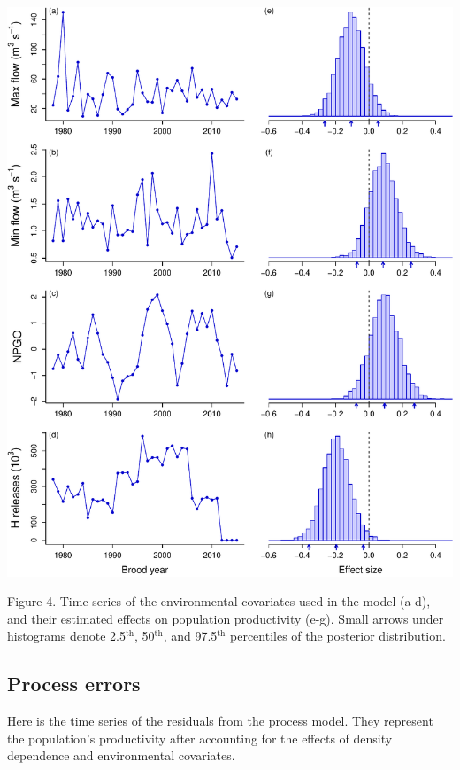 \documentclass[11pt,]{article}
\begin{document}
\begin{center}\includegraphics{App_3_Summarize_results_files/figure-latex/fig_4_cov_effects-1} \end{center}

Figure 4. Time series of the environmental covariates used in the model
(a-d), and their estimated effects on population productivity (e-g).
Small arrows under histograms denote 2.5\(^\text{th}\),
50\(^\text{th}\), and 97.5\(^\text{th}\) percentiles of the posterior
distribution.

\hypertarget{process-errors}{%
\subsection{Process errors}\label{process-errors}}

Here is the time series of the residuals from the process model. They
represent the population's productivity after accounting for the effects
of density dependence and environmental covariates.
\end{document}
